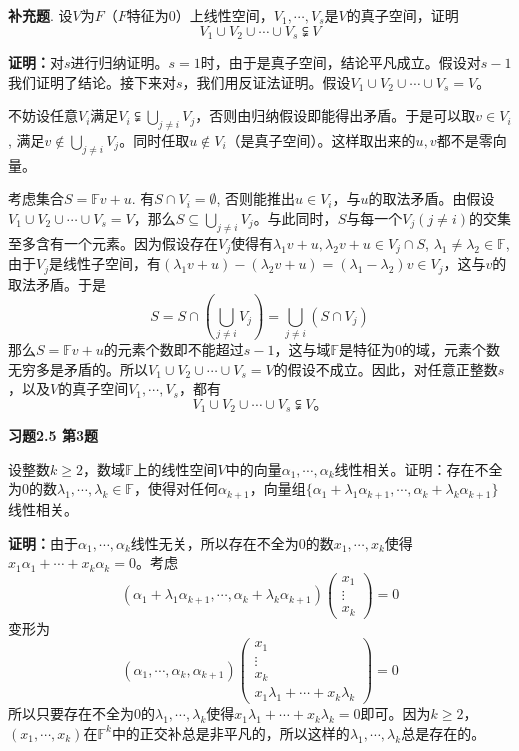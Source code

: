 \newpageorvspace

{\bf 补充题}. 设$V$为$F$（$F$特征为0）上线性空间，$V_1,\cdots,V_s$是$V$的真子空间，证明
$$V_1\cup V_2\cup \cdots \cup V_s \subsetneqq V$$

{\bf 证明：}对$s$进行归纳证明。$s=1$时，由于是真子空间，结论平凡成立。假设对$s-1$我们证明了结论。接下来对$s$，我们用反证法证明。假设$V_1\cup V_2\cup \cdots \cup V_s = V$。

不妨设任意$V_i$满足$V_i \subsetneqq \bigcup\limits_{j\neq i} V_j$，否则由归纳假设即能得出矛盾。于是可以取$v\in V_i$, 满足$v\not\in \bigcup\limits_{j\neq i} V_j$。同时任取$u\not\in V_i$（是真子空间）。这样取出来的$u,v$都不是零向量。

考虑集合$S = \mathbb{F}v + u$. 有$S\cap V_i=\emptyset$, 否则能推出$u\in V_i$，与$u$的取法矛盾。由假设$V_1\cup V_2\cup \cdots \cup V_s = V$，那么$S\subseteq \bigcup\limits_{j\neq i} V_j$。与此同时，$S$与每一个$V_j (j\neq i)$的交集至多含有一个元素。因为假设存在$V_j$使得有$\lambda_1v+u, \lambda_2v+u \in V_j\cap S$, $\lambda_1\neq\lambda_2 \in \mathbb{F}$, 由于$V_j$是线性子空间，有$(\lambda_1v+u) - (\lambda_2v+u) = (\lambda_1 - \lambda_2)v \in V_j$，这与$v$的取法矛盾。于是
$$S = S\cap (\bigcup\limits_{j\neq i} V_j) = \bigcup\limits_{j\neq i} (S \cap V_j)$$
那么$S = \mathbb{F}v + u$的元素个数即不能超过$s-1$，这与域$\mathbb{F}$是特征为0的域，元素个数无穷多是矛盾的。所以$V_1\cup V_2\cup \cdots \cup V_s = V$的假设不成立。因此，对任意正整数$s$，以及$V$的真子空间$V_1,\cdots,V_s$，都有
$$V_1\cup V_2\cup \cdots \cup V_s \subsetneqq V。$$

\newpageorvspace

{\bf 习题2.5 第3题}

设整数$k\geqslant 2$，数域$\mathbb{F}$上的线性空间$V$中的向量$\alpha_1,\cdots, \alpha_k$线性相关。证明：存在不全为0的数$\lambda_1,\cdots,\lambda_k\in \mathbb{F}$，使得对任何$\alpha_{k+1}$，向量组$\{\alpha_1+\lambda_1\alpha_{k+1}, \cdots, \alpha_k+\lambda_k\alpha_{k+1}\}$线性相关。

{\bf 证明：}由于$\alpha_1,\cdots, \alpha_k$线性无关，所以存在不全为0的数$x_1,\cdots,x_k$使得$x_1\alpha_1+\cdots+x_k\alpha_k = 0$。考虑
$$(\alpha_1+\lambda_1\alpha_{k+1}, \cdots, \alpha_k+\lambda_k\alpha_{k+1}) \begin{pmatrix} x_1 \\ \vdots \\ x_k \end{pmatrix} = 0$$
变形为
$$(\alpha_1, \cdots, \alpha_k, \alpha_{k+1}) \begin{pmatrix} x_1 \\ \vdots \\ x_k \\ x_1\lambda_1+\cdots+x_k\lambda_k \end{pmatrix} = 0$$
所以只要存在不全为0的$\lambda_1,\cdots,\lambda_k$使得$x_1\lambda_1+\cdots+x_k\lambda_k=0$即可。因为$k\geqslant 2$，$(x_1,\cdots,x_k)$在$\mathbb{F}^k$中的正交补总是非平凡的，所以这样的$\lambda_1,\cdots,\lambda_k$总是存在的。

